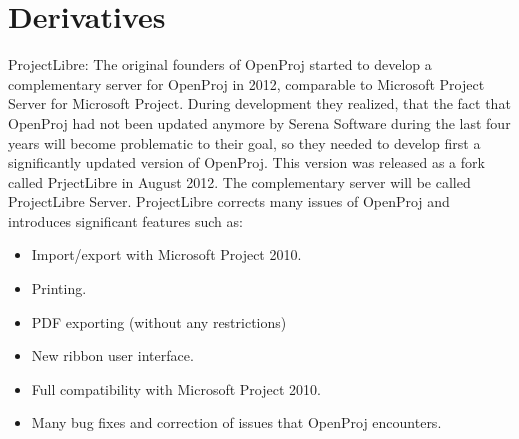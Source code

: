 \section{Derivatives}
ProjectLibre: The original founders of OpenProj started to develop a complementary server
for OpenProj in 2012, comparable to Microsoft Project Server for Microsoft Project. During
development they realized, that the fact that OpenProj had not been updated anymore by Serena
Software during the last four years will become problematic to their goal, so they needed to
develop first a significantly updated version of OpenProj. This version was released as a fork
called PrjectLibre in August 2012. The complementary server will be called ProjectLibre
Server. ProjectLibre corrects many issues of OpenProj and introduces significant features such
as:
\begin{itemize}
	\item Import/export with Microsoft Project 2010.
	\item Printing.
	\item PDF exporting (without any restrictions)
	\item New ribbon user interface.
	\item Full compatibility with Microsoft Project 2010.
	\item Many bug fixes and correction of issues that OpenProj encounters.
\end{itemize}
